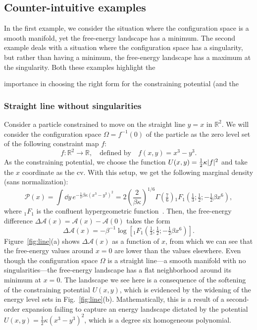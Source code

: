 \begin{subappendices}
\subsection{Counter-intuitive examples}

In the first example, we consider the situation where the configuration space is a smooth manifold, yet the free-energy landscape has a minimum.
The second example deals with a situation where the configuration space has a singularity, but rather than having a minimum, the free-energy landscape has a maximum at the singularity.
Both these examples highlight the

importance in choosing the right form for the constraining potential (and the

\subsubsection*{Straight line without singularities}

Consider a particle constrained to move on the straight line $y = x$ in $\mathbb{R}^{2}$.
We will consider the configuration space $\Omega = f^{-1}(0)$ of the particle as the zero level set of the following constraint map $f$:
%
\begin{equation}
  f: \mathbb{R}^{2} \to \mathbb{R},
  \quad\text{defined by}\quad
  f(x, y) = x^{3} - y^{3}.
\end{equation}
%
As the constraining potential, we choose the function $U(x, y) = \frac{1}{2}\kappa\lvert f\rvert^{2}$ and take the $x$ coordinate as the \ac{cv}.
With this setup, we get the following marginal density (sans normalization):
%
\begin{equation}
  \mathscr{P}(x) = \int \dd{y}\,e^{-\frac{1}{2}\beta\kappa (x^{3}-y^{3})^{2}}= 2\left(\frac{2}{\beta\kappa}\right)^{1/6}\Gamma\left(\tfrac{7}{6}\right){}_{1}\!F_{1}\left(\tfrac{1}{3};\tfrac{1}{2};-\tfrac{1}{2}\beta x^{6}\right),
\end{equation}
%
where ${}_{1}\!F_{1}$ is the confluent hypergeometric function~\cite{olver2010}.
Then, the free-energy difference $\Delta\mathscr{A}(x) = \mathscr{A}(x) - \mathscr{A}(0)$ takes the form
%
\begin{equation}
  \Delta\mathscr{A}(x) = -\beta^{-1}\log\left[{}_{1}\!F_{1}\left(\tfrac{1}{3};\tfrac{1}{2};-\tfrac{1}{2}\beta x^{6}\right)\right].
\end{equation}
%
Figure~\ref{fig:line}(a) shows $\Delta\mathscr{A}(x)$ as a function of $x$, from which we can see that the free-energy values around $x = 0$ are lower than the values elsewhere.
Even though the configuration space $\Omega$ is a straight line---a smooth manifold with no singularities---the free-energy landscape has a flat neighborhood around its minimum at $x = 0$.
The landscape we see here is a consequence of the softening of the constraining potential $U(x, y)$, which is evidenced by the widening of the energy level sets in Fig.~\ref{fig:line}(b).
Mathematically, this is a result of a second-order expansion failing to capture an energy landscape dictated by the potential $U(x, y) = \frac{1}{2}\kappa(x^{3}-y^{3})^{2}$, which is a degree six homogeneous polynomial.


\end{subappendices}
